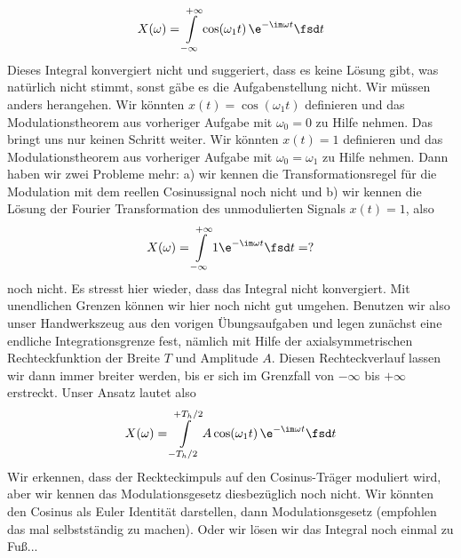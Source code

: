 \begin{Ansatz}
\begin{align}
X(\omega) = \int\limits_{-\infty}^{+\infty} \cos(\omega_1 t) \, \e^{-\im \omega t} \fsd t
\end{align}
Dieses Integral konvergiert nicht und suggeriert, dass es keine Lösung gibt, was
natürlich nicht stimmt, sonst gäbe es die Aufgabenstellung nicht. Wir müssen
anders herangehen.
%
Wir könnten $x(t) = \cos(\omega_1 t)$ definieren und das Modulationstheorem
aus vorheriger Aufgabe mit $\omega_0=0$ zu Hilfe nehmen. Das bringt uns nur keinen
Schritt weiter.
%
Wir könnten $x(t) = 1$ definieren und das Modulationstheorem
aus vorheriger Aufgabe mit $\omega_0=\omega_1$ zu Hilfe nehmen. Dann haben wir
zwei Probleme mehr: a) wir kennen die Transformationsregel für die Modulation
mit dem reellen Cosinussignal noch nicht und b) wir kennen die Lösung der
Fourier Transformation des unmodulierten Signals $x(t)=1$, also
\begin{align}
X(\omega) = \int\limits_{-\infty}^{+\infty} 1 \e^{-\im \omega t} \fsd t = ?
\end{align}
noch nicht. Es stresst hier wieder, dass das Integral nicht konvergiert. Mit
unendlichen Grenzen können wir hier noch nicht gut umgehen.
%
Benutzen wir also unser Handwerkszeug aus den vorigen Übungsaufgaben und legen zunächst
eine endliche Integrationsgrenze fest, nämlich mit Hilfe der
axialsymmetrischen Rechteckfunktion der Breite $T$ und Amplitude $A$. Diesen
Rechteckverlauf lassen wir dann immer breiter werden, bis er sich im Grenzfall
von $-\infty$ bis
$+\infty$ erstreckt.
%
Unser Ansatz lautet also
\begin{align}
X(\omega) = \int\limits_{-T_h/2}^{+T_h/2} A \cos(\omega_1 t) \, \e^{-\im \omega t} \fsd t
\end{align}
Wir erkennen, dass der Reckteckimpuls auf den Cosinus-Träger moduliert wird, aber
wir kennen das Modulationsgesetz diesbezüglich noch nicht. Wir könnten den Cosinus als Euler Identität darstellen, dann Modulationsgesetz (empfohlen das mal selbstständig zu machen).
%
Oder wir lösen wir das Integral noch einmal zu Fuß...
\end{Ansatz}
